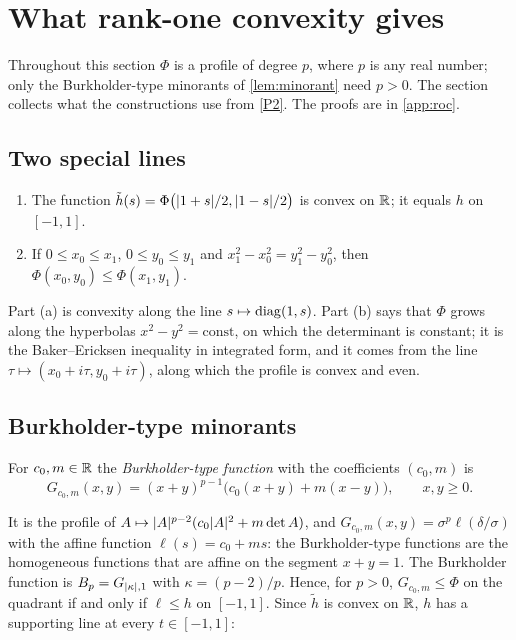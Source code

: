 \section{What rank-one convexity gives}\label{sec:roc}

Throughout this section $\Phi$ is a profile of degree $p$, where $p$ is any real number; only
the Burkholder-type minorants of \cref{lem:minorant} need $p>0$. The section collects what the
constructions use from \ref{P2}. The proofs are in \cref{app:roc}.

\subsection{Two special lines}

\begin{lemma}\label{lem:basic}
\begin{enumerate}[label=\textup{(\alph*)}]
\item The function $\tilde h(s)=\Phi\bigl(\lvert 1+s\rvert/2,\lvert 1-s\rvert/2\bigr)$ is convex on $\mathbb{R}$;
  it equals $h$ on $[-1,1]$.
\item If $0\le x_0\le x_1$, $0\le y_0\le y_1$ and $x_1^2-x_0^2=y_1^2-y_0^2$, then
  $\Phi(x_0,y_0)\le\Phi(x_1,y_1)$.
\end{enumerate}
\end{lemma}

Part (a) is convexity along the line $s\mapsto\operatorname{diag}(1,s)$. Part (b) says that $\Phi$ grows along
the hyperbolas $x^2-y^2=\mathrm{const}$, on which the determinant is constant; it is the
Baker--Ericksen inequality in integrated form, and it comes from the line
$\tau\mapsto(x_0+i\tau,y_0+i\tau)$, along which the profile is convex and even.

\subsection{Burkholder-type minorants}

\begin{definition}\label{def:minorant}
For $c_0,m\in\mathbb{R}$ the \emph{Burkholder-type function} with the coefficients $(c_0,m)$ is
\[
  G_{c_0,m}(x,y)=(x+y)^{p-1}\bigl(c_0(x+y)+m(x-y)\bigr),\qquad x,y\ge0 .
\]
\end{definition}

It is the profile of $A\mapsto\lvert A\rvert^{p-2}(c_0\lvert A\rvert^2+m\det A)$, and
$G_{c_0,m}(x,y)=\sigma^p\ell(\delta/\sigma)$ with the affine function $\ell(s)=c_0+ms$: the
Burkholder-type functions are the homogeneous functions that are affine on the segment
$x+y=1$. The Burkholder function is $B_p=G_{\lvert \kappa\rvert,1}$ with $\kappa=(p-2)/p$. Hence, for
$p>0$, $G_{c_0,m}\le\Phi$ on the quadrant if and only if $\ell\le h$ on $[-1,1]$. Since
$\tilde h$ is convex on $\mathbb{R}$, $h$ has a supporting line at every $t\in[-1,1]$:

